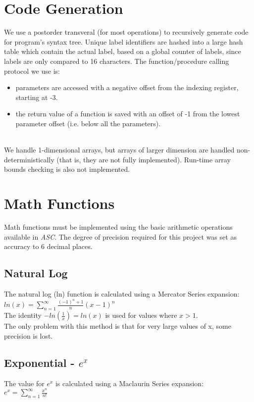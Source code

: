 \documentclass{report}
\begin{document}
\section*{Code Generation}
We use a postorder transveral (for most operations) to recursively generate code for program's syntax tree. Unique label identifiers are hashed into a large hash table which contain the actual label, based on a global counter of labels, since labels are only compared to 16 characters. The function/procedure calling protocol we use is:
\begin{itemize}
\item parameters are accessed with a negative offset from the indexing register, starting at -3.
\item the return value of a function is saved with an offset of -1 from the lowest parameter offset (i.e. below all the parameters).
\end{itemize}
\\
We handle 1-dimensional arrays, but arrays of larger dimension are handled non-deterministically (that is, they are not fully implemented). Run-time array bounds checking is also not implemented.

\section*{Math Functions}
Math functions must be implemented using the basic arithmetic operations available in \emph{ASC}. The degree of precision required for this project was set as accuracy to 6 decimal places.
\subsection*{Natural Log}
The natural log (ln) function is calculated using a Mercator Series expansion:\\
$ ln(x) = \displaystyle\sum_{n=1}^{\infty} \frac{(-1)^n+1}{n} (x-1)^n $ \\
The identity $ -ln(\frac{1}{x}) = ln(x)$ is used for values where $x > 1$.\\
The only problem with this method is that for very large values of x, some precision is lost. 

\subsection*{Exponential - $e^x$}
The value for $e^x$ is calculated using a Maclaurin Series expansion:\\
$ e^x = \displaystyle\sum_{n=1}^{\infty} \frac{x^n}{n!}  $ \\
\end{document}
